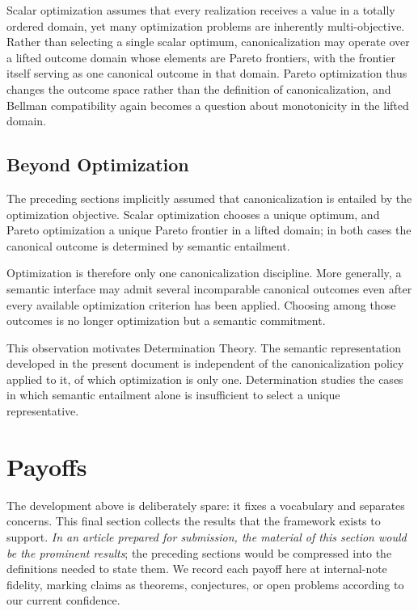 \documentclass[sigconf,nonacm]{acmart}
\theoremstyle{definition}
\theoremstyle{plain}
\theoremstyle{remark}
\begin{document}
Scalar optimization assumes that every realization receives a value in
a totally ordered domain, yet many optimization problems are inherently
multi-objective.  Rather than selecting a single scalar optimum,
canonicalization may operate over a lifted outcome domain whose elements
are Pareto frontiers, with the frontier itself serving as one canonical
outcome in that domain.  Pareto optimization thus changes the outcome
space rather than the definition of canonicalization, and Bellman
compatibility again becomes a question about monotonicity in the lifted
domain.

\subsection{Beyond Optimization}

The preceding sections implicitly assumed that canonicalization is
entailed by the optimization objective.  Scalar optimization chooses a
unique optimum, and Pareto optimization a unique Pareto frontier in a
lifted domain; in both cases the canonical outcome is determined by
semantic entailment.

Optimization is therefore only one canonicalization discipline.  More
generally, a semantic interface may admit several incomparable canonical
outcomes even after every available optimization criterion has been
applied.  Choosing among those outcomes is no longer optimization but a
semantic commitment.

This observation motivates Determination Theory.  The semantic
representation developed in the present document is independent of the
canonicalization policy applied to it, of which optimization is only
one.  Determination studies the cases in which semantic entailment alone
is insufficient to select a unique representative.

\section{Payoffs}
\label{sec:payoffs}

The development above is deliberately spare: it fixes a vocabulary
and separates concerns.  This final section collects the results
that the framework exists to support.  \emph{In an article prepared
for submission, the material of this section would be the prominent
results}; the preceding sections would be compressed into the
definitions needed to state them.  We record each payoff here at
internal-note fidelity, marking claims as theorems, conjectures, or
open problems according to our current confidence.
\end{document}
